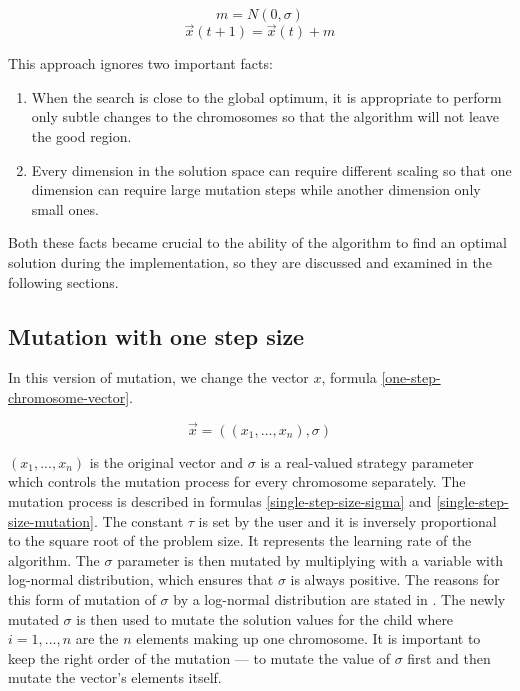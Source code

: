 \begin{equation}
    m = N(0, \sigma)
\end{equation}
\begin{equation} \label{simple-mutation}
    \vec{x}(t+1) = \vec{x}(t) + m
\end{equation}

This approach ignores two important facts:
\begin{enumerate}
    \item When the search is close to the global optimum, it is appropriate to perform only subtle changes to the chromosomes so that the algorithm will not leave the good region.
    \item Every dimension in the solution space can require different scaling so that one dimension can require large mutation steps while another dimension only small ones.
\end{enumerate}

Both these facts became crucial to the ability of the algorithm to find an optimal solution during the implementation, so they are discussed and examined in the following sections.

\subsection{Mutation with one step size}
In this version of mutation, we change the vector $x$, formula \ref{one-step-chromosome-vector}.

\begin{equation} \label{one-step-chromosome-vector}
\vec{x} = ((x_1,...,x_n),\sigma)
\end{equation}

 $(x_1,...,x_n)$ is the original vector and $\sigma$ is a real-valued strategy parameter which controls the mutation process for every chromosome separately. The mutation process is described in formulas \ref{single-step-size-sigma} and \ref{single-step-size-mutation}. The constant $\tau$ is set by the user and it is inversely proportional to the square root of the problem size. It represents the learning rate of the algorithm. The $\sigma$ parameter is then mutated by multiplying with a variable with log-normal distribution, which ensures that $\sigma$ is always positive. The reasons for this form of mutation of $\sigma$ by a log-normal distribution are stated in \cite{x}. The newly mutated $\sigma$ is then used to mutate the solution values for the child where $i = 1,...,n$ are the $n$ elements making up one chromosome. It is important to keep the right order of the mutation --- to mutate the value of $\sigma$ first and then mutate the vector's elements itself.

